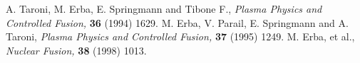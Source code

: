 
\begin{thebibliography}{99}

A. Taroni, M. Erba, E. Springmann and Tibone F.,
{\em Plasma Physics and Controlled Fusion,} {\bf 36} (1994) 1629.
M. Erba, V. Parail, E. Springmann and A. Taroni,
{\em Plasma Physics and Controlled Fusion,} {\bf 37} (1995) 1249.
M. Erba, et al.,
{\em Nuclear Fusion,} {\bf 38} (1998) 1013.
\end{thebibliography}

